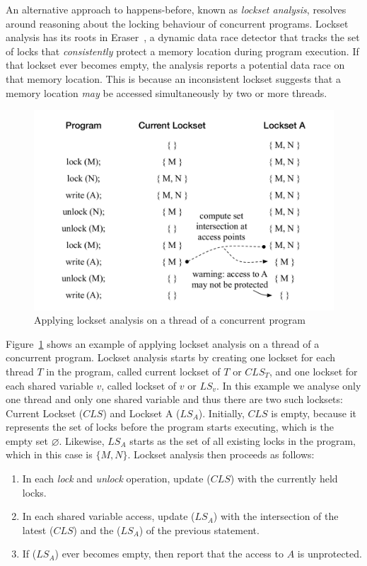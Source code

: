 An alternative approach to happens-before, known as \emph{lockset analysis}, resolves around reasoning about the locking behaviour of concurrent programs. Lockset analysis has its roots in Eraser~\cite{savage1997eraser}, a dynamic data race detector that tracks the set of locks that \emph{consistently} protect a memory location during program execution. If that lockset ever becomes empty, the analysis reports a potential data race on that memory location. This is because an inconsistent lockset suggests that a memory location \emph{may} be accessed simultaneously by two or more threads.

\begin{figure}[htbp]
\centering
\includegraphics[width=1\linewidth]{img/lockset.pdf}
\caption{Applying lockset analysis on a thread of a concurrent program}
\label{fig:locksets}
\end{figure}

Figure~\ref{fig:locksets} shows an example of applying lockset analysis on a thread of a concurrent program. Lockset analysis starts by creating one lockset for each thread $T$ in the program, called current lockset of $T$ or $CLS_T$, and one lockset for each shared variable $v$, called lockset of $v$ or $LS_v$. In this example we analyse only one thread and only one shared variable and thus there are two such locksets: Current Lockset ($CLS$) and Lockset A ($LS_A$). Initially, $CLS$ is empty, because it represents the set of locks before the program starts executing, which is the empty set $\varnothing$. Likewise, $LS_A$ starts as the set of all existing locks in the program, which in this case is $\{M, N\}$. Lockset analysis then proceeds as follows:

\begin{enumerate}
\item In each \emph{lock} and \emph{unlock} operation, update ($CLS$) with the currently held locks.
\item In each shared variable access, update ($LS_A$) with the intersection of the latest ($CLS$) and the ($LS_A$) of the previous statement.
\item If ($LS_A$) ever becomes empty, then report that the access to $A$ is unprotected.
\end{enumerate}

